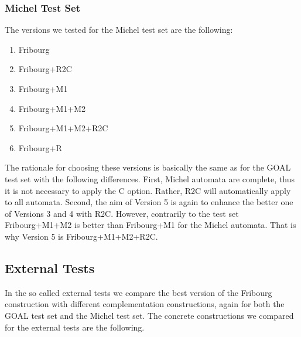 

\subsubsection{Michel Test Set}
The versions we tested for the Michel test set are the following:
\begin{enumerate}
\item Fribourg
\item Fribourg+R2C
\item Fribourg+M1
\item Fribourg+M1+M2
\item Fribourg+M1+M2+R2C
\item Fribourg+R
\end{enumerate}

The rationale for choosing these versions is basically the same as for the GOAL test set with the following differences. First, Michel automata are complete, thus it is not necessary to apply the C option. Rather, R2C will automatically apply to all automata. Second, the aim of Version 5 is again to enhance the better one of Versions 3 and 4 with R2C. However, contrarily to the \goal{} test set Fribourg+M1+M2 is better than Fribourg+M1 for the Michel automata. That is why Version 5 is Fribourg+M1+M2+R2C.


\subsection{External Tests}
In the so called external tests we compare the best version of the Fribourg construction with different complementation constructions, again for both the GOAL test set and the Michel test set. The concrete constructions we compared for the external tests are the following.

